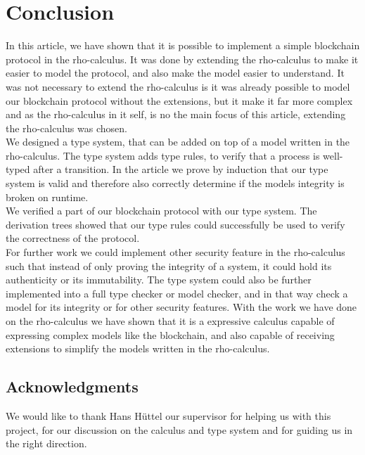 \section{Conclusion}
In this article, we have shown that it is possible to implement a simple blockchain protocol in the rho-calculus. It was done by extending the rho-calculus to make it easier to model the protocol, and also make the model easier to understand. It was not necessary to extend the rho-calculus is it was already possible to model our blockchain protocol without the extensions, but it make it far more complex and as the rho-calculus in it self, is no the main focus of this article, extending the rho-calculus was chosen.\\
We designed a type system, that can be added on top of a model written in the rho-calculus. The type system adds type rules, to verify that a process is well-typed after a transition. In the article we prove by induction that our type system is valid and therefore also correctly determine if the models integrity is broken on runtime.\\
We verified a part of our blockchain protocol with our type system. The derivation trees showed that our type rules could successfully be used to verify the correctness of the protocol.\\

For further work we could implement other security feature in the rho-calculus such that instead of only proving the integrity of a system, it could hold its authenticity or its immutability. The type system could also be further implemented into a full type checker or model checker, and in that way check a model for its integrity or for other security features. With the work we have done on the rho-calculus we have shown that it is a expressive calculus capable of expressing complex models like the blockchain, and also capable of receiving extensions to simplify the models written in the rho-calculus.


\subsection*{Acknowledgments}
We would like to thank Hans Hüttel our supervisor for helping us with this project, for our discussion on the calculus and type system and for guiding us in the right direction.
